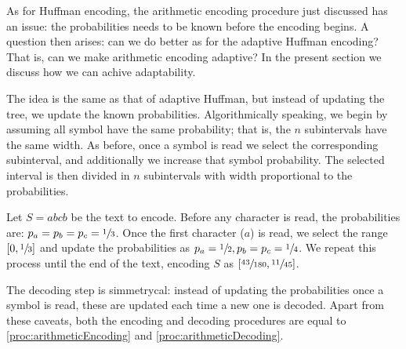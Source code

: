 \documentclass{subfiles}
\begin{document}
    As for Huffman encoding, the arithmetic encoding procedure just discussed
        has an issue: the probabilities needs to be known before the encoding begins.
        A question then arises: can we do better as for the adaptive Huffman encoding?
        That is, can we make arithmetic encoding adaptive? 
        In the present section we discuss how we can achive adaptability.

    The idea is the same as that of adaptive Huffman, but instead of 
        updating the tree, we update the known probabilities.
        Algorithmically speaking, we begin by assuming all symbol have the same probability;
        that is, the \(n\) subintervals have the same width.
        As before, once a symbol is read we select the corresponding subinterval,
        and additionally we increase that symbol probability. The selected 
        interval is then divided in \(n\) subintervals with width proportional to the probabilities.

    \begin{example*}
        Let \(S = abcb\) be the text to encode. 
            Before any character is read, the probabilities are: \(p_{a} = p_{b}
                = p_{c} = \sfrac{1}{3}\).
        Once the first character (\(a\)) is read, we select the range \([0, \sfrac{1}{3}]\)
        and update the probabilities as \(p_{a} = \sfrac{1}{2}, p_{b} = p_{c} = \sfrac{1}{4}\).
        We repeat this process until the end of the text, 
        encoding \(S\) as \([\sfrac{43}{180}, \sfrac{11}{45}]\).
                
    \end{example*}

    The decoding step is simmetrycal: instead of updating the probabilities once a 
        symbol is read, these are updated each time a new one is decoded.
        Apart from these caveats, both the encoding and decoding procedures 
        are equal to \autoref{proc:arithmeticEncoding} and \autoref{proc:arithmeticDecoding}.    
\end{document}

